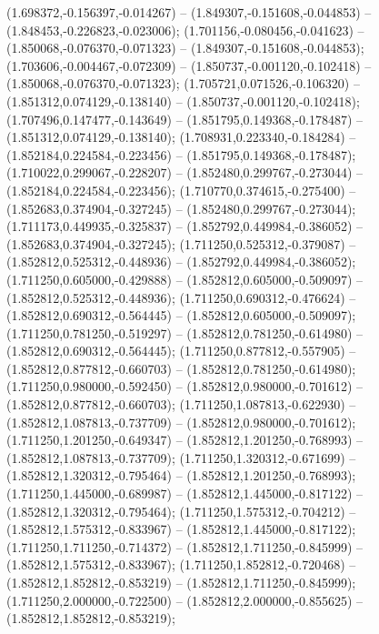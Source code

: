  (1.698372,-0.156397,-0.014267) -- (1.849307,-0.151608,-0.044853) -- (1.848453,-0.226823,-0.023006);
 (1.701156,-0.080456,-0.041623) -- (1.850068,-0.076370,-0.071323) -- (1.849307,-0.151608,-0.044853);
 (1.703606,-0.004467,-0.072309) -- (1.850737,-0.001120,-0.102418) -- (1.850068,-0.076370,-0.071323);
 (1.705721,0.071526,-0.106320) -- (1.851312,0.074129,-0.138140) -- (1.850737,-0.001120,-0.102418);
 (1.707496,0.147477,-0.143649) -- (1.851795,0.149368,-0.178487) -- (1.851312,0.074129,-0.138140);
 (1.708931,0.223340,-0.184284) -- (1.852184,0.224584,-0.223456) -- (1.851795,0.149368,-0.178487);
 (1.710022,0.299067,-0.228207) -- (1.852480,0.299767,-0.273044) -- (1.852184,0.224584,-0.223456);
 (1.710770,0.374615,-0.275400) -- (1.852683,0.374904,-0.327245) -- (1.852480,0.299767,-0.273044);
 (1.711173,0.449935,-0.325837) -- (1.852792,0.449984,-0.386052) -- (1.852683,0.374904,-0.327245);
 (1.711250,0.525312,-0.379087) -- (1.852812,0.525312,-0.448936) -- (1.852792,0.449984,-0.386052);
 (1.711250,0.605000,-0.429888) -- (1.852812,0.605000,-0.509097) -- (1.852812,0.525312,-0.448936);
 (1.711250,0.690312,-0.476624) -- (1.852812,0.690312,-0.564445) -- (1.852812,0.605000,-0.509097);
 (1.711250,0.781250,-0.519297) -- (1.852812,0.781250,-0.614980) -- (1.852812,0.690312,-0.564445);
 (1.711250,0.877812,-0.557905) -- (1.852812,0.877812,-0.660703) -- (1.852812,0.781250,-0.614980);
 (1.711250,0.980000,-0.592450) -- (1.852812,0.980000,-0.701612) -- (1.852812,0.877812,-0.660703);
 (1.711250,1.087813,-0.622930) -- (1.852812,1.087813,-0.737709) -- (1.852812,0.980000,-0.701612);
 (1.711250,1.201250,-0.649347) -- (1.852812,1.201250,-0.768993) -- (1.852812,1.087813,-0.737709);
 (1.711250,1.320312,-0.671699) -- (1.852812,1.320312,-0.795464) -- (1.852812,1.201250,-0.768993);
 (1.711250,1.445000,-0.689987) -- (1.852812,1.445000,-0.817122) -- (1.852812,1.320312,-0.795464);
 (1.711250,1.575312,-0.704212) -- (1.852812,1.575312,-0.833967) -- (1.852812,1.445000,-0.817122);
 (1.711250,1.711250,-0.714372) -- (1.852812,1.711250,-0.845999) -- (1.852812,1.575312,-0.833967);
 (1.711250,1.852812,-0.720468) -- (1.852812,1.852812,-0.853219) -- (1.852812,1.711250,-0.845999);
 (1.711250,2.000000,-0.722500) -- (1.852812,2.000000,-0.855625) -- (1.852812,1.852812,-0.853219);
